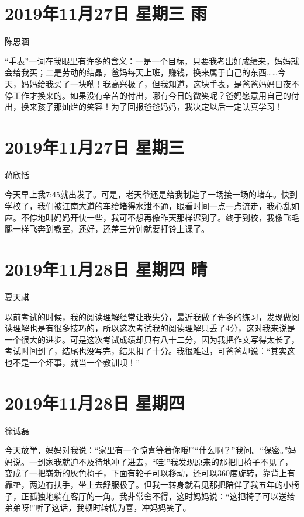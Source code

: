 \section{2019年11月27日 星期三 雨}

陈思涵

``手表''一词在我眼里有许多的含义：一是一个目标，只要我考出好成绩来，妈妈就会给我买；二是劳动的结晶，爸妈每天上班，赚钱，换来属于自己的东西\ldots\ldots 今天，妈妈给我买了一块嘞！我高兴极了，但我知道，这块手表，是爸爸妈妈日夜不停工作才换来的。如果没有辛苦的付出，哪有今日的微笑呢？爸妈愿意用自己的付出，换来孩子那灿烂的笑容！为了回报爸爸妈妈，我决定以后一定认真学习！

\section{2019年11月27日 星期三}

蒋欣恬

今天早上我7:45就出发了。可是，老天爷还是给我制造了一场接一场的堵车。快到学校了，我们被江南大道的车给堵得水泄不通，眼看时间一点一点流走，我心乱如麻。不停地叫妈妈开快一些，我可不想再像昨天那样迟到了。终于到校，我像飞毛腿一样飞奔到教室，还好，还差三分钟就要打铃上课了。

\section{2019年11月28日 星期四 晴}

夏天祺

以前考试的时候，我的阅读理解经常让我失分，最近我做了许多的练习，发现做阅读理解也是有很多技巧的，所以这次考试我的阅读理解只丢了4分，这对我来说是一个很大的进步。可是这次考试成绩却只有八十二分，因为我把作文写得太长了，考试时间到了，结尾也没写完，结果扣了十分。我很难过，可爸爸却说：``其实这也不是一个坏事，就当一个教训呗！''

\section{2019年11月28日 星期四}

徐诚磊

今天放学，妈妈对我说：``家里有一个惊喜等着你哦!''``什么啊？''我问。``保密。''妈妈说。一到家我就迫不及待地冲了进去，``哇!''我发现原来的那把旧椅子不见了，变成了一把崭新的灰色椅子，下面有轮子可以移动，还可以360度旋转，靠背上有靠垫，两边有扶手，坐上去舒服极了。但我一转身就看见那把陪伴了我五年的小椅子，正孤独地躺在客厅的一角。我非常舍不得，这时妈妈说：``这把椅子可以送给弟弟呀!''听了这话，我顿时转忧为喜，冲妈妈笑了。

